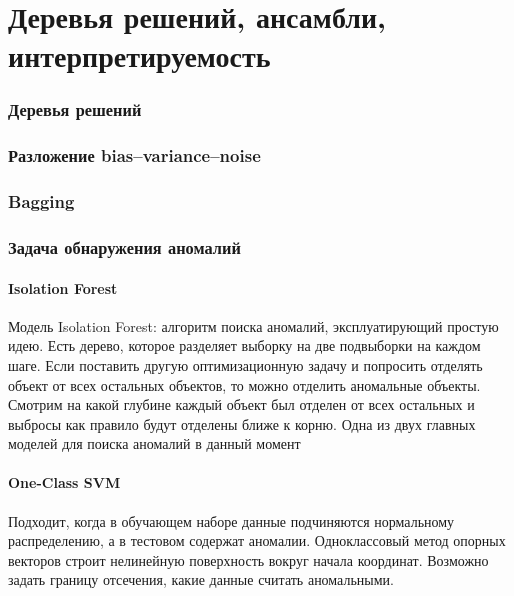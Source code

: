 \documentclass[a4paper, 14pt]{article}
\begin{document}
    \part{Деревья решений, ансамбли, интерпретируемость}
    
    \section{Деревья решений}
    
    
    \section{Разложение bias–variance–noise}
    
    
    \section{Bagging}
    
    
    \section{Задача обнаружения аномалий}
    
    \subsection{Isolation Forest}
    
    Модель Isolation Forest: алгоритм поиска аномалий, эксплуатирующий простую идею.
    Есть дерево, которое разделяет выборку на две подвыборки на каждом шаге.
    Если поставить другую оптимизационную задачу и попросить отделять объект от всех остальных объектов, то можно
    отделить аномальные объекты.
    Смотрим на какой глубине каждый объект был отделен от всех остальных и выбросы как правило будут отделены ближе к
    корню.
    Одна из двух главных моделей для поиска аномалий в данный момент
    
    \subsection{One-Class SVM}
    
    Подходит, когда в обучающем наборе данные подчиняются нормальному распределению, а в тестовом содержат аномалии.
    Одноклассовый метод опорных векторов строит нелинейную поверхность вокруг начала координат.
    Возможно задать границу отсечения, какие данные считать аномальными.
    
\end{document}
